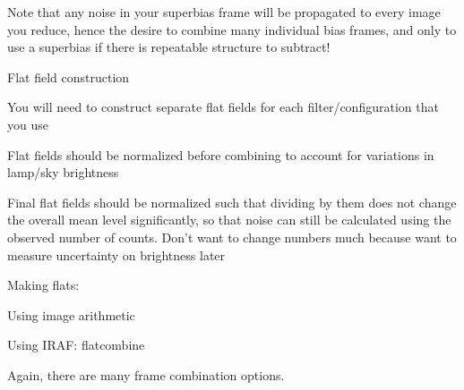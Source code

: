 \documentclass{article}
\begin{document}
\begin{itemize*}
\begin{itemize*}
\begin{itemize*}
                \end{itemize*}
            \item Note that any noise in your superbias frame will be propagated to
                every image you reduce, hence the desire to combine many individual
                bias frames, and only to use a superbias if there is repeatable
                structure to subtract!
        \end{itemize*}
    \item Flat field construction
        \begin{itemize*}
            \item You will need to construct separate flat fields for each
                filter/configuration that you use
            \item Flat fields should be normalized before combining to account for
                variations in lamp/sky brightness
            \item Final flat fields should be normalized such that dividing by them does
                not change the overall mean level significantly, so that noise can
                still be calculated using the observed number of
                counts. Don't want to change numbers much because want
                to measure uncertainty on brightness later
            \item Making flats:
                \begin{itemize*}
                    \item Using image arithmetic
                    \item Using IRAF: flatcombine
                    \item Again, there are many frame combination options.
                \end{itemize*}
        \end{itemize*}
\end{itemize*}
\end{document}
